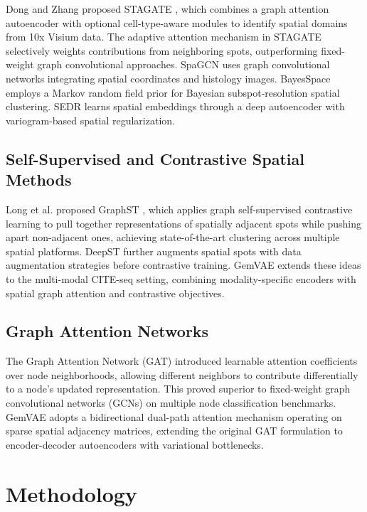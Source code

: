 \documentclass[conference]{IEEEtran}
\begin{document}
Dong and Zhang proposed STAGATE \cite{b2}, which combines a graph attention autoencoder with optional cell-type-aware modules to identify spatial domains from 10x Visium data. The adaptive attention mechanism in STAGATE selectively weights contributions from neighboring spots, outperforming fixed-weight graph convolutional approaches. SpaGCN \cite{b6} uses graph convolutional networks integrating spatial coordinates and histology images. BayesSpace \cite{b7} employs a Markov random field prior for Bayesian subspot-resolution spatial clustering. SEDR \cite{b13} learns spatial embeddings through a deep autoencoder with variogram-based spatial regularization.

\subsection{Self-Supervised and Contrastive Spatial Methods}

Long et al. proposed GraphST \cite{b5}, which applies graph self-supervised contrastive learning to pull together representations of spatially adjacent spots while pushing apart non-adjacent ones, achieving state-of-the-art clustering across multiple spatial platforms. DeepST \cite{b12} further augments spatial spots with data augmentation strategies before contrastive training. GemVAE extends these ideas to the multi-modal CITE-seq setting, combining modality-specific encoders with spatial graph attention and contrastive objectives.

\subsection{Graph Attention Networks}

The Graph Attention Network (GAT) \cite{b1} introduced learnable attention coefficients over node neighborhoods, allowing different neighbors to contribute differentially to a node's updated representation. This proved superior to fixed-weight graph convolutional networks (GCNs) on multiple node classification benchmarks. GemVAE adopts a bidirectional dual-path attention mechanism operating on sparse spatial adjacency matrices, extending the original GAT formulation to encoder-decoder autoencoders with variational bottlenecks.

\section{Methodology}
\end{document}
